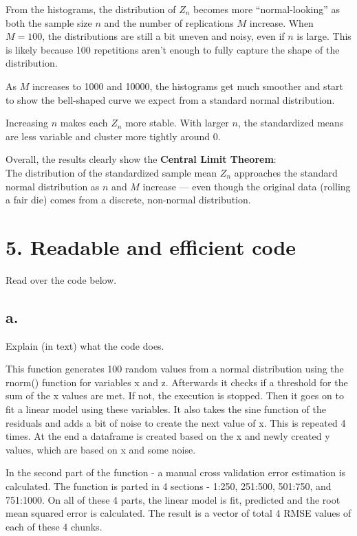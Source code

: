 \documentclass[
]{article}
\begin{document}
From the histograms, the distribution of \(Z_n\) becomes more
``normal-looking'' as both the sample size \(n\) and the number of
replications \(M\) increase. When \(M = 100\), the distributions are
still a bit uneven and noisy, even if \(n\) is large. This is likely
because 100 repetitions aren't enough to fully capture the shape of the
distribution.

As \(M\) increases to 1000 and 10000, the histograms get much smoother
and start to show the bell-shaped curve we expect from a standard normal
distribution.

Increasing \(n\) makes each \(Z_n\) more stable. With larger \(n\), the
standardized means are less variable and cluster more tightly around 0.

Overall, the results clearly show the \textbf{Central Limit Theorem}:\\
The distribution of the standardized sample mean \(Z_n\) approaches the
standard normal distribution as \(n\) and \(M\) increase --- even though
the original data (rolling a fair die) comes from a discrete, non-normal
distribution.

\section{5. Readable and efficient
code}\label{readable-and-efficient-code}

Read over the code below.

\subsection{a.}\label{a.-4}

Explain (in text) what the code does.

This function generates 100 random values from a normal distribution
using the rnorm() function for variables x and z. Afterwards it checks
if a threshold for the sum of the x values are met. If not, the
execution is stopped. Then it goes on to fit a linear model using these
variables. It also takes the sine function of the residuals and adds a
bit of noise to create the next value of x. This is repeated 4 times. At
the end a dataframe is created based on the x and newly created y
values, which are based on x and some noise.

In the second part of the function - a manual cross validation error
estimation is calculated. The function is parted in 4 sections - 1:250,
251:500, 501:750, and 751:1000. On all of these 4 parts, the linear
model is fit, predicted and the root mean squared error is calculated.
The result is a vector of total 4 RMSE values of each of these 4 chunks.
\end{document}
